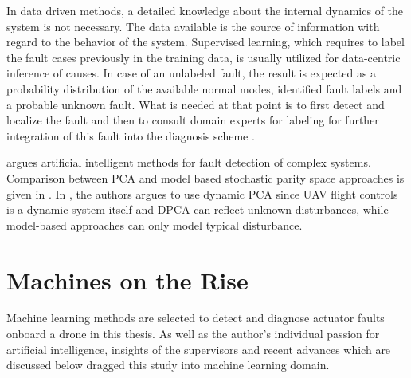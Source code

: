 In data driven methods, a detailed knowledge about the internal dynamics 
of the system is not necessary. The data available is the source of information 
with regard to the behavior of the system. Supervised learning, which requires 
to label the fault cases previously in the training data, is usually utilized for 
data-centric inference of causes. In case of an unlabeled fault, the result is 
expected as a probability distribution of the available normal modes, identified 
fault labels and a probable unknown fault. What is needed at that point is to 
first detect and localize the fault and then to consult domain experts for labeling 
for further integration of this fault into the diagnosis scheme \cite{dataCentricDiagOffline}.

\cite{gui2002fault} argues artificial intelligent methods for fault detection of complex 
systems. Comparison between PCA and model based stochastic parity space 
approaches is given in \cite{hagenblad2004comparison}.
In \cite{li2016data}, the authors argues to use dynamic PCA since UAV flight 
controls is a dynamic system itself and DPCA can reflect unknown disturbances, 
while model-based approaches can only model typical disturbance.  

\section{Machines on the Rise}

Machine learning methods are selected to detect and diagnose actuator faults onboard a drone in this thesis. 
As well as the author's individual passion for artificial intelligence, insights of the supervisors and recent advances which are discussed below dragged this study into machine learning domain.

